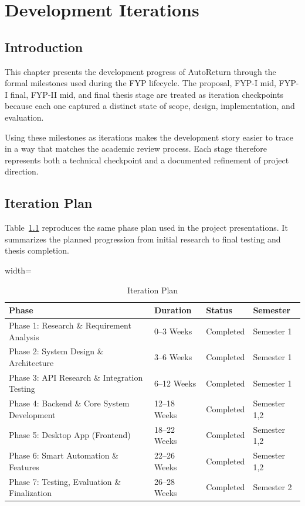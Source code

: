 \chapter{Development Iterations}
\label{sec:iterations}

\section{Introduction}
This chapter presents the development progress of AutoReturn through the formal milestones used during the FYP lifecycle. The proposal, FYP-I mid, FYP-I final, FYP-II mid, and final thesis stage are treated as iteration checkpoints because each one captured a distinct state of scope, design, implementation, and evaluation.

Using these milestones as iterations makes the development story easier to trace in a way that matches the academic review process. Each stage therefore represents both a technical checkpoint and a documented refinement of project direction.

\section{Iteration Plan}
\noindent Table~\ref{tab:gantt_iteration_plan} reproduces the same phase plan used in the project presentations. It summarizes the planned progression from initial research to final testing and thesis completion.
\begin{table}[!htbp]
\centering
\small
\renewcommand{\arraystretch}{1.15}
\setlength{\tabcolsep}{5pt}
\begin{adjustbox}{width=\textwidth}
\begin{tabular}{|p{7.2cm}|p{2.3cm}|p{2.2cm}|p{2.2cm}|}
\hline
\textbf{Phase} & \textbf{Duration} & \textbf{Status} & \textbf{Semester} \\ \hline
Phase 1: Research \& Requirement Analysis & 0--3 Weeks & Completed & Semester 1 \\ \hline
Phase 2: System Design \& Architecture & 3--6 Weeks & Completed & Semester 1 \\ \hline
Phase 3: API Research \& Integration Testing & 6--12 Weeks & Completed & Semester 1 \\ \hline
Phase 4: Backend \& Core System Development & 12--18 Weeks & Completed & Semester 1,2 \\ \hline
Phase 5: Desktop App (Frontend) & 18--22 Weeks & Completed & Semester 1,2 \\ \hline
Phase 6: Smart Automation \& Features & 22--26 Weeks & Completed & Semester 1,2 \\ \hline
Phase 7: Testing, Evaluation \& Finalization & 26--28 Weeks & Completed & Semester 2 \\ \hline
\end{tabular}
\end{adjustbox}
\caption{Iteration Plan}
\label{tab:gantt_iteration_plan}
\end{table}

